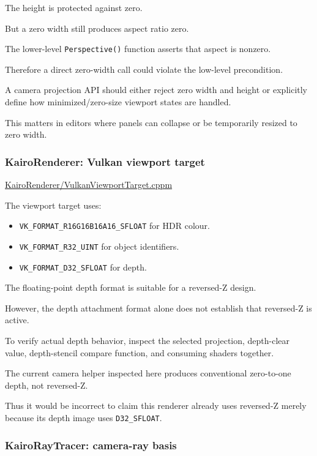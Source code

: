 The height is protected against zero.

But a zero width still produces aspect ratio zero.

The lower-level \texttt{Perspective()} function asserts that aspect is nonzero.

Therefore a direct zero-width call could violate the low-level precondition.

A camera projection API should either reject zero width and height or explicitly define how minimized/zero-size viewport states are handled.

This matters in editors where panels can collapse or be temporarily resized to zero width.

\subsubsection{KairoRenderer: Vulkan viewport target}\label{02-foundations-ii-ch037-kairorenderer-vulkan-viewport-target}

\href{https://github.com/swayam8624/KairoRenderer/blob/main/VulkanViewportTarget.cppm?utm_source=chatgpt.com}{KairoRenderer/VulkanViewportTarget.cppm}

The viewport target uses:

\begin{itemize}
\tightlist
\item
  \texttt{VK\_FORMAT\_R16G16B16A16\_SFLOAT} for HDR colour.
\item
  \texttt{VK\_FORMAT\_R32\_UINT} for object identifiers.
\item
  \texttt{VK\_FORMAT\_D32\_SFLOAT} for depth.
\end{itemize}

The floating-point depth format is suitable for a reversed-Z design.

However, the depth attachment format alone does not establish that reversed-Z is active.

To verify actual depth behavior, inspect the selected projection, depth-clear value, depth-stencil compare function, and consuming shaders together.

The current camera helper inspected here produces conventional zero-to-one depth, not reversed-Z.

Thus it would be incorrect to claim this renderer already uses reversed-Z merely because its depth image uses \texttt{D32\_SFLOAT}.

\subsubsection{KairoRayTracer: camera-ray basis}\label{02-foundations-ii-ch037-kairoraytracer-camera-ray-basis}

